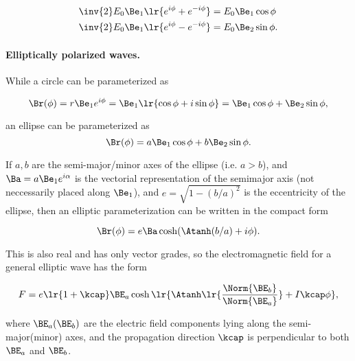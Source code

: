 \begin{dmath}\label{eqn:ellipticalWaves:300}
\begin{aligned}
   \inv{2} E_0 \Be_1 \lr{ e^{i \phi} + e^{-i\phi} } &= E_0 \Be_1 \cos\phi \\
   \inv{2} E_0 \Be_1 \lr{ e^{i \phi} - e^{-i\phi} } &= E_0 \Be_2 \sin\phi.
\end{aligned}
\end{dmath}

\paragraph{Elliptically polarized waves.}

While a circle can be parameterized as

\begin{dmath}\label{eqn:ellipticalWaves:320}
\Br(\phi)
=
r \Be_1 e^{i \phi}
=
\Be_1 \lr{ \cos\phi + i \sin\phi }
=
\Be_1 \cos\phi + \Be_2 \sin\phi,
\end{dmath}

an ellipse can be parameterized as
\begin{dmath}\label{eqn:ellipticalWaves:340}
\Br(\phi)
=
a \Be_1 \cos\phi + b \Be_2 \sin\phi.
\end{dmath}

If \( a, b \) are the semi-major/minor axes of the ellipse (i.e. \( a > b \)),
and \( \Ba = a \Be_1 e^{i\alpha} \) is the vectorial representation of the semimajor axis (not neccessarily placed along \( \Be_1 \)),
and \( e = \sqrt{1 - (b/a)^2} \) is the eccentricity of the ellipse,
then an elliptic parameterization can be written
\citep{hestenes1999nfc}
in the compact form

\begin{dmath}\label{eqn:ellipticalWaves:360}
\Br(\phi)
=
e \Ba \cosh( \Atanh(b/a) + i \phi).
\end{dmath}

This is also real and has only vector grades, so the electromagnetic field for a general elliptic wave has the form

\begin{dmath}\label{eqn:ellipticalWaves:380}
F
=
e \lr{ 1 + \kcap } \BE_a
\cosh\lr{ \Atanh\lr{ \frac{\Norm{\BE_b}}{\Norm{\BE_a}}} + I \kcap \phi},
\end{dmath}

where \( \BE_a(\BE_b) \) are the electric field components lying along the semi-major(minor) axes, and the propagation direction \( \kcap \) is perpendicular to both \( \BE_a \) and \(\BE_b\).

